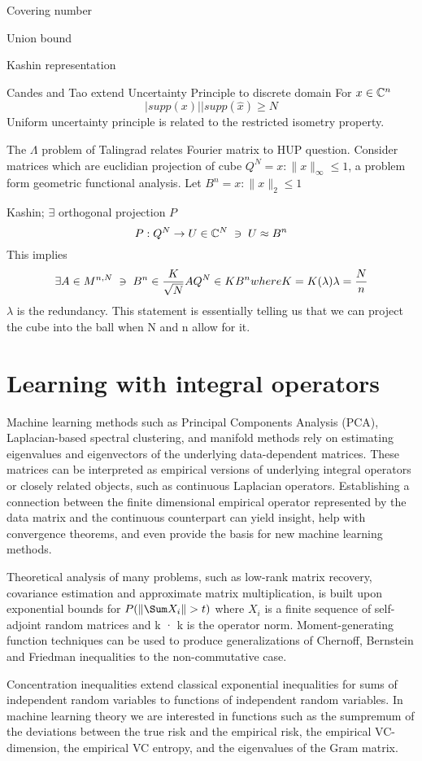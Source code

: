 Covering number

Union bound

Kashin representation

Candes and Tao extend Uncertainty Principle to discrete domain
For $x \in \mathbb C^n$
\begin{equation*}
  |supp(x)| |supp(\hat{x}) \geq N
\end{equation*}
Uniform uncertainty principle is related to the restricted isometry property.

The $\Lambda$ problem of Talingrad relates Fourier matrix to HUP question.  Consider matrices which are euclidian projection of cube $Q^N = {x : \parallel x \parallel_\infty  \leq 1}$, a problem form geometric functional analysis.  Let $B^n = {x : \parallel x \parallel_2  \leq 1}$

Kashin; $\exists$ orthogonal projection $P$
\begin{equation*}
  P : Q^N \rightarrow U \in \mathbb C^N \; \ni \; U \approx B^n
\end{equation*}
This implies
\begin{equation*}
  \exists A \in M^{n,N} \; \ni \; B^n \in \frac{K}{\sqrt{N}} A Q^N \in K B^n where K = K(\lambda) \lambda=\frac{N}{n}
\end{equation*}
$\lambda$ is the redundancy.  This statement is essentially telling us that we can project the cube into the ball when N and n allow for it.

\section{Learning with integral operators}
Machine learning methods such as Principal Components Analysis (PCA), Laplacian-based spectral clustering, and manifold methods rely on estimating eigenvalues and eigenvectors of the underlying data-dependent matrices.  These matrices can be interpreted as empirical versions of underlying integral operators or closely related objects, such as continuous Laplacian operators.  Establishing a connection between the finite dimensional empirical operator represented by the data matrix and the continuous counterpart can yield insight, help with convergence theorems, and even provide the basis for new machine learning methods.  

Theoretical analysis of many problems, such as low-rank matrix recovery, covariance estimation and approximate matrix multiplication, is built upon exponential bounds for $P(\| \Sum X_i \| > t)$ where ${X_i}$ is a finite sequence of self-adjoint random matrices and k · k is the operator norm. Moment-generating function techniques can be used to produce generalizations of Chernoff, Bernstein and Friedman inequalities
to the non-commutative case.

Concentration inequalities extend classical exponential inequalities for sums of independent random variables to functions of independent random variables.  In machine learning theory we are interested in functions such as the sumpremum of the deviations between the true risk and the empirical risk, the empirical VC-dimension, the empirical VC entropy, and the eigenvalues of the Gram matrix.  